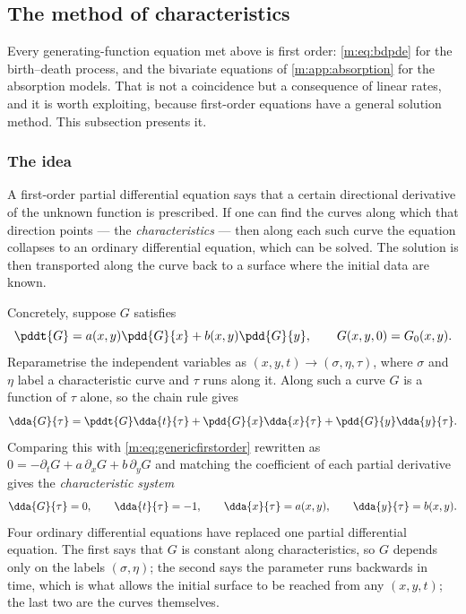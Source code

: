 \subsection{The method of characteristics}
\label{m:sec:moc}

Every generating-function equation met above is first order: \cref{m:eq:bdpde} for
the birth--death process, and the bivariate equations of
\cref{m:app:absorption} for the absorption models. That is not a coincidence but a
consequence of linear rates, and it is worth exploiting, because first-order
equations have a general solution method. This subsection presents it.

\subsubsection{The idea}
\label{m:sec:mocidea}

A first-order partial differential equation says that a certain directional
derivative of the unknown function is prescribed. If one can find the curves along
which that direction points --- the \emph{characteristics} --- then along each such
curve the equation collapses to an ordinary differential equation, which can be
solved. The solution is then transported along the curve back to a surface where
the initial data are known.

Concretely, suppose $G$ satisfies
\begin{equation}
\label{m:eq:genericfirstorder}
\pddt{G} = a(x,y)\pdd{G}{x} + b(x,y)\pdd{G}{y},
\qquad
G(x,y,0) = G_0(x,y) .
\end{equation}
Reparametrise the independent variables as $(x,y,t)\to(\sigma,\eta,\tau)$, where
$\sigma$ and $\eta$ label a characteristic curve and $\tau$ runs along it. Along
such a curve $G$ is a function of $\tau$ alone, so the chain rule gives
\begin{equation}
\label{m:eq:chainrule}
\dda{G}{\tau}
= \pddt{G}\dda{t}{\tau} + \pdd{G}{x}\dda{x}{\tau} + \pdd{G}{y}\dda{y}{\tau} .
\end{equation}
Comparing this with \cref{m:eq:genericfirstorder} rewritten as
$0 = -\partial_tG + a\,\partial_xG + b\,\partial_yG$ and matching the coefficient of
each partial derivative gives the \emph{characteristic system}
\begin{equation}
\label{m:eq:genericcharacteristics}
\dda{G}{\tau} = 0,
\qquad
\dda{t}{\tau} = -1,
\qquad
\dda{x}{\tau} = a(x,y),
\qquad
\dda{y}{\tau} = b(x,y) .
\end{equation}
Four ordinary differential equations have replaced one partial differential
equation. The first says that $G$ is constant along characteristics, so $G$ depends
only on the labels $(\sigma,\eta)$; the second says the parameter runs backwards in
time, which is what allows the initial surface to be reached from any $(x,y,t)$; the
last two are the curves themselves.

